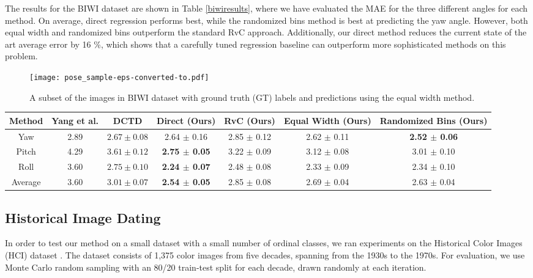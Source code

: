 \documentclass[10pt, conference, a4paper]{IEEEtran}
\begin{document}
The results for the BIWI dataset are shown in Table \ref{biwiresults}, where we have evaluated the MAE for the three different angles for each method. On average, direct regression performs best, while the randomized bins method is best at predicting the yaw angle. However, both equal width and randomized bins outperform the standard RvC approach. Additionally, our direct method reduces the current state of the art average error by 16 \%, which shows that a carefully tuned regression baseline can outperform more sophisticated methods on this problem. 

\begin{figure}[t]
  \centering
  \texttt{[image: pose\_sample-eps-converted-to.pdf]}
  \caption{A subset of the images in BIWI dataset \cite{eth_biwi_00839} with ground truth (GT) labels and predictions using the equal width method.}
\label{biwi_preview}
\end{figure}

\begin{table*}[t]
\vspace{0.1in}
\renewcommand{\arraystretch}{1.3}
\caption{Mean average error in degrees for the different methods on the Biwi \cite{eth_biwi_00839} test set.}
\label{biwiresults}
\centering
\begin{tabular}{c c c c c c c}
\hline
Method & Yang et al. \cite{yang2019fsa}   & DCTD \cite{gustafsson2019dctd} & Direct (Ours) & RvC (Ours) & Equal Width (Ours) & Randomized Bins (Ours)\\ \hline
Yaw & 2.89 & $2.67 \pm 0.08$ & 2.64 $\pm$ 0.16 & 2.85 $\pm$ 0.12 & 2.62 $\pm$ 0.11 & \textbf{2.52 $\pm$ 0.06}  \\
Pitch & 4.29 & $3.61 \pm 0.12$ & \textbf{2.75 $\pm$ 0.05} & 3.22 $\pm$ 0.09 & 3.12 $\pm$ 0.08 & 3.01 $\pm$ 0.10 \\
Roll & 3.60 & $2.75 \pm 0.10$ & \textbf{2.24 $\pm$ 0.07} & 2.48 $\pm$ 0.08 & 2.33 $\pm$ 0.09 & 2.34 $\pm$ 0.10 \\
\hline
Average & $3.60$ & $3.01 \pm 0.07$ & \textbf{2.54 $\pm$ 0.05} & 2.85 $\pm$ 0.08 & 2.69 $\pm$ 0.04 & 2.63 $\pm$ 0.04 \\
\hline
\end{tabular}
\end{table*}

\subsection{Historical Image Dating}
In order to test our method on a small dataset with a small number of ordinal classes, we ran experiments on the Historical Color Images (HCI) dataset \cite{DBLP:conf/eccv/PalermoHE12}. The dataset consists of 1,375 color images from five decades, spanning from the 1930s to the 1970s. For evaluation, we use Monte Carlo random sampling with an 80/20 train-test split for each decade, drawn randomly at each iteration.
\end{document}
